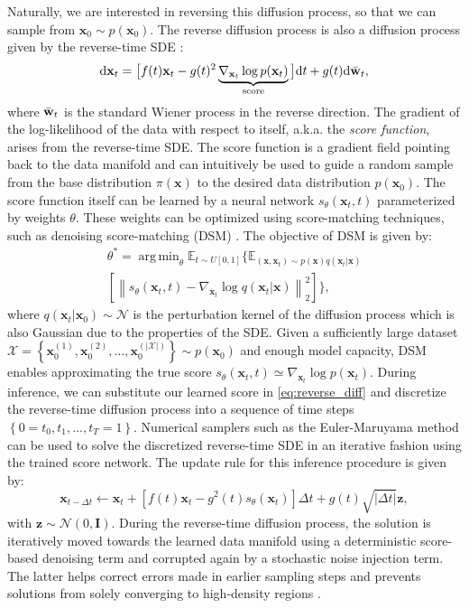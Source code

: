 \documentclass[journal,twoside,web]{ieeecolor}
\newcommand{\bx}{{\mathbf x}}
\newcommand{\bz}{{\mathbf z}}
\newcommand{\bI}{{\mathbf I}}
\newcommand{\norm}[1]{\left\lVert#1\right\rVert}
\DeclareMathOperator*{\argmin}{arg\,min}
\begin{document}
Naturally, we are interested in reversing this diffusion process, so that we can sample from $\bx_0 \sim p(\bx_0)$. The reverse diffusion process is also a diffusion process given by the reverse-time SDE \cite{songScoreBasedGenerativeModeling2021}:
\begin{equation}
    \mathrm{d}\bx_t = 
    \big[
        f(t)\bx_t - g(t)^2\underbrace{\nabla_{\bx_t} \log{p(\bx_t)}}_{\text{score}}
    \big] \mathrm{d}t + g(t)\mathrm{d}\Bar{\mathbf{w}}_t,
    \label{eq:reverse_diff}
\end{equation}
where $\Bar{\mathbf{w}}_t$ is the standard Wiener process in the reverse direction. The gradient of the log-likelihood of the data with respect to itself, a.k.a. the \textit{score function}, arises from the reverse-time SDE. The score function is a gradient field pointing back to the data manifold and can intuitively be used to guide a random sample from the base distribution $\pi(\bx)$ to the desired data distribution $p(\bx_0)$. The score function itself can be learned by a neural network $s_\theta(\bx_t, t)$ parameterized by weights $\theta$. These weights can be optimized using score-matching techniques, such as denoising score-matching (DSM) \cite{vincentConnectionScoreMatching2011}. The objective of DSM is given by:
\begin{align}
    \theta^* = \argmin_\theta \mathbb{E}_{t\sim U[0, 1]}
    \biggl\{
        \mathbb{E}_{(\bx, \bx_t)\sim p(\bx)q(\bx_t|\bx)}  \nonumber \\
        \left[ 
            \norm{s_\theta(\bx_t, t) - \nabla_{\bx_t}\log q(\bx_t|\bx)}_2^2
        \right]
    \biggr\},
    \label{eq:score_matching}
\end{align}
where $q(\bx_t|\bx_0)\sim\mathcal{N}$ is the perturbation kernel of the diffusion process which is also Gaussian due to the properties of the SDE. Given a sufficiently large dataset $\mathcal{X} = \left\{\bx_0^{(1)}, \bx_0^{(2)}, \ldots,  \bx_0^{(|\mathcal{X}|)}\right\}\sim p(\bx_0)$ and enough model capacity, DSM enables approximating the true score $s_\theta(\bx_t, t)\simeq \nabla_{\bx_t}\log p(\bx_t)$. During inference, we can substitute our learned score in \eqref{eq:reverse_diff} and discretize the reverse-time diffusion process into a sequence of time steps $\left\{0=t_0, t_1, \ldots, t_T=1 \right\}$. Numerical samplers such as the Euler-Maruyama method \cite{songScoreBasedGenerativeModeling2021} can be used to solve the discretized reverse-time SDE in an iterative fashion using the trained score network. The update rule for this inference procedure is given by:
\begin{equation}
\bx_{t - \Delta t} \leftarrow \bx_t + [f(t)\bx_t - g^2(t) s_\theta(\bx_t)]\Delta t + g(t) \sqrt{\vert\Delta t\vert}\bz,
\end{equation}
with $\bz \sim \mathcal{N}\left(0, \bI\right)$. During the reverse-time diffusion process, the solution is iteratively moved towards the learned data manifold using a deterministic score-based denoising term and corrupted again by a stochastic noise injection term. The latter helps correct errors made in earlier sampling steps and prevents solutions from solely converging to high-density regions \cite{songGenerativeModelingEstimating2019, karrasElucidatingDesignSpace2022}.
\end{document}
